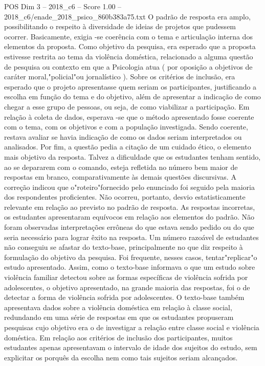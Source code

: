 \begin{textsample}{POS Dim 3 – 2018\_c6 – Score 1.00 – 2018\_c6/enade\_2018\_psico\_860b383a75.txt}
O padrão de resposta era amplo, possibilitando o respeito à diversidade de ideias de projetos que pudessem ocorrer.
Basicamente, exigia -se coerência com o tema e articulação interna dos elementos da proposta.
Como objetivo da pesquisa, era esperado que a proposta estivesse restrita ao tema da violência doméstica, relacionado a alguma questão de pesquisa ou contexto em que a Psicologia atua ( por oposição a objetivos de caráter moral,"policial"ou jornalístico ).
Sobre os critérios de inclusão, era esperado que o projeto apresentasse quem seriam os participantes, justificando a escolha em função do tema e do objetivo, além de apresentar a indicação de como chegar a esse grupo de pessoas, ou seja, de como viabilizar a participação.
Em relação à coleta de dados, esperava -se que o método apresentado fosse coerente com o tema, com os objetivos e com a população investigada.
Sendo coerente, restava avaliar se havia indicação de como os dados seriam interpretados ou analisados.
Por fim, a questão pedia a citação de um cuidado ético, o elemento mais objetivo da resposta.
Talvez a dificuldade que os estudantes tenham sentido, ao se depararem com o comando, esteja refletida no número bem maior de respostas em branco, comparativamente às demais questões discursivas.
A correção indicou que o"roteiro"fornecido pelo enunciado foi seguido pela maioria dos respondentes proficientes.
Não ocorreu, portanto, desvio estatisticamente relevante em relação ao previsto no padrão de resposta.
As respostas incorretas, os estudantes apresentaram equívocos em relação aos elementos do padrão.
Não foram observadas interpretações errôneas do que estava sendo pedido ou do que seria necessário para lograr êxito na resposta.
Um número razoável de estudantes não conseguiu se afastar do texto-base, principalmente no que diz respeito à formulação do objetivo da pesquisa.
Foi frequente, nesses casos, tentar"replicar"o estudo apresentado.
Assim, como o texto-base informava o que um estudo sobre violência familiar detectou sobre as formas específicas de violência sofrida por adolescentes, o objetivo apresentado, na grande maioria das respostas, foi o de detectar a forma de violência sofrida por adolescentes.
O texto-base também apresentava dados sobre a violência doméstica em relação à classe social, redundando em uma série de respostas em que os estudantes propuseram pesquisas cujo objetivo era o de investigar a relação entre classe social e violência doméstica.
Em relação aos critérios de inclusão dos participantes, muitos estudantes apenas apresentavam o intervalo de idade dos sujeitos do estudo, sem explicitar os porquês da escolha nem como tais sujeitos seriam alcançados.

\end{textsample}
